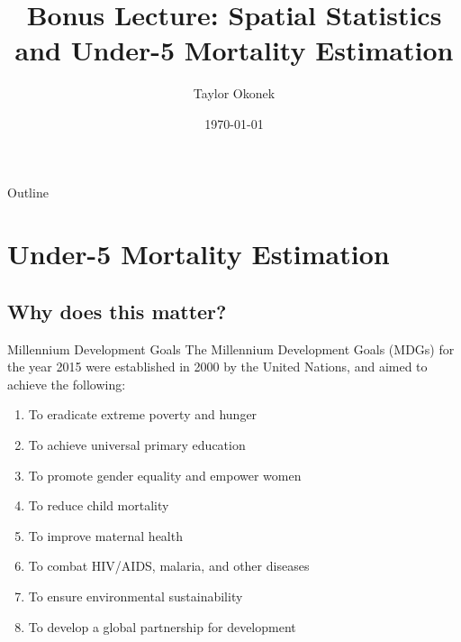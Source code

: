 \documentclass[10pt,t]{beamer}
\title{Bonus Lecture: Spatial Statistics and Under-5 Mortality Estimation}
\author{Taylor Okonek}
\date{\today}
\begin{document}
\begin{frame}
	\titlepage 
\end{frame}


\begin{frame}{Outline}
	\tableofcontents
\end{frame}



\section{Under-5 Mortality Estimation}

\subsection{Why does this matter?}

\begin{frame}{Millennium Development Goals}
The Millennium Development Goals (MDGs) for the year 2015 were established in 2000 by the United Nations, and aimed to achieve the following:
\vspace{0.3cm}

\begin{enumerate}
	\item To eradicate extreme poverty and hunger
	\item To achieve universal primary education
	\item To promote gender equality and empower women
	\item To reduce child mortality
	\item To improve maternal health
	\item To combat HIV/AIDS, malaria, and other diseases
	\item To ensure environmental sustainability
	\item To develop a global partnership for development
\end{enumerate}
\end{frame}
\end{document}
